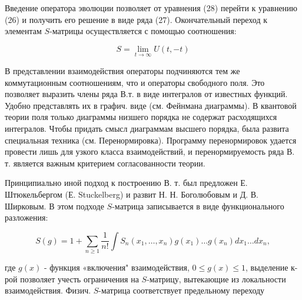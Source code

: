 \documentclass[10pt]{article}
\begin{document}
Введение оператора эволюции позволяет от уравнения (28) перейти к уравнению (26) и получить его решение в виде ряда (27). Окончательный переход к элементам $S$-матрицы осуществляется с помощью соотношения:



\[

S=\lim _{t \rightarrow \infty} U(t,-t)

\]



В представлении взаимодействия операторы подчиняются тем же коммутационным соотношениям, что и операторы свободного поля. Это позволяет выразить члены ряда В.т. в виде интегралов от известных функций. Удобно представлять их в графич. виде (см. Фейнмана диаграммы). В квантовой теории поля только диаграммы низшего порядка не содержат расходящихся интегралов. Чтобы придать смысл диаграммам высшего порядка, была развита специальная техника (см. Перенормировка). Программу перенормировок удается провести лишь для узкого класса взаимодействий, и перенормируемость ряда В. т. является важным критерием согласованности теории.



Принципиально иной подход к построению В. т. был предложен Е. Штюкельбергом (Е. Stuckelberg) и развит Н. Н. Боголюбовым и Д. В. Ширковым. В этом подходе $S$-матрица записывается в виде функционального разложения:



\[

S(g)=1+\sum_{n \geqslant 1} \frac{1}{n !} \int S_{n}\left(x_{1}, \ldots, x_{n}\right) g\left(x_{1}\right) \ldots g\left(x_{n}\right) d x_{1} \ldots d x_{n},

\]



где $g(x)$ - функция «включения" взаимодействия, $0 \leqslant g(x) \leqslant 1$, выделение к-рой позволяет учесть ограничения на $S$-матрицу, вытекающие из локальности взаимодействия. Физич. $S$-матрица соответствует предельному переходу
\end{document}

